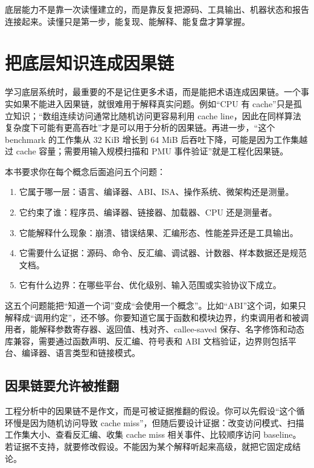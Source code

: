 \begin{keyidea}
底层能力不是靠一次读懂建立的，而是靠反复把源码、工具输出、机器状态和报告连接起来。读懂只是第一步，能复现、能解释、能复盘才算掌握。
\end{keyidea}

\section{把底层知识连成因果链}

学习底层系统时，最重要的不是记住更多术语，而是能把术语连成因果链。一个事实如果不能进入因果链，就很难用于解释真实问题。例如“CPU 有 cache”只是孤立知识；“数组连续访问通常比随机访问更容易利用 cache line，因此在同样算法复杂度下可能有更高吞吐”才是可以用于分析的因果链。再进一步，“这个 benchmark 的工作集从 32 KiB 增长到 64 MiB 后吞吐下降，可能是因为工作集越过 cache 容量；需要用输入规模扫描和 PMU 事件验证”就是工程化因果链。

本书要求你在每个概念后面追问五个问题：

\begin{enumerate}
  \item 它属于哪一层：语言、编译器、ABI、ISA、操作系统、微架构还是测量。
  \item 它约束了谁：程序员、编译器、链接器、加载器、CPU 还是测量者。
  \item 它能解释什么现象：崩溃、错误结果、汇编形态、性能差异还是工具输出。
  \item 它需要什么证据：源码、命令、反汇编、调试器、计数器、样本数据还是规范文档。
  \item 它有什么边界：在哪些平台、优化级别、输入范围或实验协议下成立。
\end{enumerate}

这五个问题能把“知道一个词”变成“会使用一个概念”。比如“ABI”这个词，如果只解释成“调用约定”，还不够。你要知道它属于函数和模块边界，约束调用者和被调用者，能解释参数寄存器、返回值、栈对齐、callee-saved 保存、名字修饰和动态库兼容，需要通过函数声明、反汇编、符号表和 ABI 文档验证，边界则包括平台、编译器、语言类型和链接模式。

\subsection{因果链要允许被推翻}

工程分析中的因果链不是作文，而是可被证据推翻的假设。你可以先假设“这个循环慢是因为随机访问导致 cache miss”，但随后要设计证据：改变访问模式、扫描工作集大小、查看反汇编、收集 cache miss 相关事件、比较顺序访问 baseline。若证据不支持，就要修改假设。不能因为某个解释听起来高级，就把它固定成结论。

